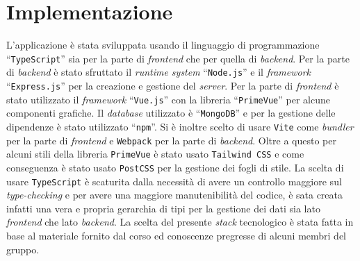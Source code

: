 \chapter{Implementazione}
L'applicazione è stata sviluppata usando il linguaggio di programmazione ``\texttt{TypeScript}'' sia per la parte di \textit{frontend} che per quella di \textit{backend}. Per la parte di \textit{backend} è stato sfruttato il \textit{runtime system} ``\texttt{Node.js}'' e il \textit{framework} ``\texttt{Express.js}'' per la creazione e gestione del \textit{server}. Per la parte di \textit{frontend} è stato utilizzato il \textit{framework} ``\texttt{Vue.js}'' con la libreria ``\texttt{PrimeVue}'' per alcune componenti grafiche. Il \textit{database} utilizzato è ``\texttt{MongoDB}'' e per la gestione delle dipendenze è stato utilizzato ``\texttt{npm}''.\newline
Si è inoltre scelto di usare \texttt{Vite} come \textit{bundler} per la parte di \textit{frontend} e \texttt{Webpack} per la parte di \textit{backend}. Oltre a questo per alcuni stili della libreria \texttt{PrimeVue} è stato usato \texttt{Tailwind CSS} e come conseguenza è stato usato \texttt{PostCSS} per la gestione dei fogli di stile. \newline
La scelta di usare \texttt{TypeScript} è scaturita dalla necessità di avere un controllo maggiore sul \textit{type-checking} e per avere una maggiore manutenibilità del codice, è sata creata infatti una vera e propria gerarchia di tipi per la gestione dei dati sia lato \textit{frontend} che lato \textit{backend}. \newline
La scelta del presente \textit{stack} tecnologico è stata fatta in base al materiale fornito dal corso ed conoscenze pregresse di alcuni membri del gruppo.

